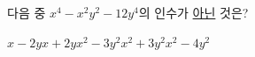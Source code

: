 다음 중 $x^4-x^2y^2-12y^4$의 인수가 \underline{아닌} 것은?
\begin{choices32}{$x-2y$}{$x+2y$}{$x^2-3y^2$}{$x^2+3y^2$}{$x^2-4y^2$}\end{choices32}
